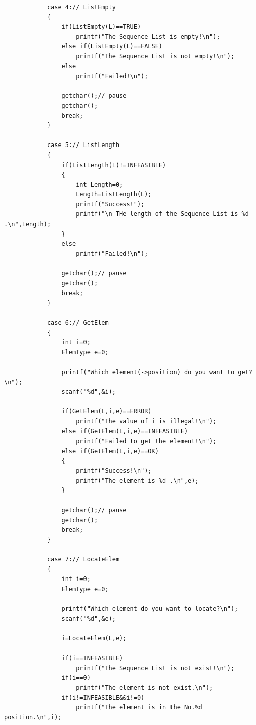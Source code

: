 \documentclass[supercite]{Experimental_Report}
\theoremstyle{definition}
\begin{document}
\begin{lstlisting}
            case 4:// ListEmpty
            {
                if(ListEmpty(L)==TRUE)   
                    printf("The Sequence List is empty!\n");
                else if(ListEmpty(L)==FALSE) 
                    printf("The Sequence List is not empty!\n");
                else 
                    printf("Failed!\n");

                getchar();// pause
                getchar();
                break;
            }

            case 5:// ListLength
            {
                if(ListLength(L)!=INFEASIBLE)
                {
                    int Length=0;
                    Length=ListLength(L);
                    printf("Success!");
                    printf("\n THe length of the Sequence List is %d .\n",Length);
                }
                else 
                    printf("Failed!\n");

                getchar();// pause
                getchar();
                break;
            }

            case 6:// GetElem
            {
                int i=0; 
                ElemType e=0;

                printf("Which element(->position) do you want to get?\n");
                scanf("%d",&i);

                if(GetElem(L,i,e)==ERROR)
                    printf("The value of i is illegal!\n");
                else if(GetElem(L,i,e)==INFEASIBLE) 
                    printf("Failed to get the element!\n");
                else if(GetElem(L,i,e)==OK) 
                {
                    printf("Success!\n");
                    printf("The element is %d .\n",e);
                }     

                getchar();// pause
                getchar();
                break;
            }

            case 7:// LocateElem
            {   
                int i=0;
                ElemType e=0;

                printf("Which element do you want to locate?\n");
                scanf("%d",&e);

                i=LocateElem(L,e);

                if(i==INFEASIBLE)
                    printf("The Sequence List is not exist!\n");
                if(i==0)
                    printf("The element is not exist.\n");
                if(i!=INFEASIBLE&&i!=0)
                    printf("The element is in the No.%d position.\n",i);


\end{lstlisting}
\end{document}

